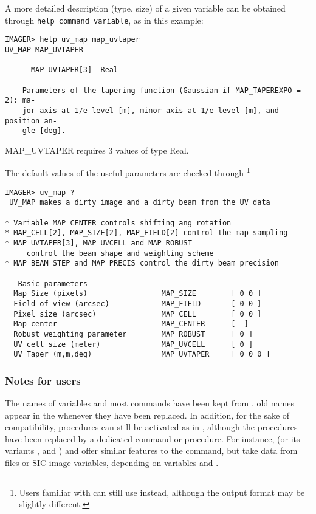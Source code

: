 A more detailed description (type, size) of a given variable can be obtained 
through \texttt{help command variable}, as in this example:
\begin{verbatim} 
IMAGER> help uv_map map_uvtaper
UV_MAP MAP_UVTAPER
 
      MAP_UVTAPER[3]  Real
 
    Parameters of the tapering function (Gaussian if MAP_TAPEREXPO = 2): ma-
    jor axis at 1/e level [m], minor axis at 1/e level [m], and position an-
    gle [deg].
\end{verbatim} 
MAP\_UVTAPER requires 3 values of type Real.
\vspace{0.5cm}

The default values of the useful parameters are checked through 
\footnote{Users familiar with \mapping{} can still use 
 instead, although the output format may be slightly 
different.}
\begin{verbatim} 
IMAGER> uv_map ?
 UV_MAP makes a dirty image and a dirty beam from the UV data
 
* Variable MAP_CENTER controls shifting ang rotation
* MAP_CELL[2], MAP_SIZE[2], MAP_FIELD[2] control the map sampling
* MAP_UVTAPER[3], MAP_UVCELL and MAP_ROBUST
     control the beam shape and weighting scheme
* MAP_BEAM_STEP and MAP_PRECIS control the dirty beam precision
 
-- Basic parameters 
  Map Size (pixels)                 MAP_SIZE        [ 0 0 ]
  Field of view (arcsec)            MAP_FIELD       [ 0 0 ]
  Pixel size (arcsec)               MAP_CELL        [ 0 0 ] 
  Map center                        MAP_CENTER      [  ]      
  Robust weighting parameter        MAP_ROBUST      [ 0 ]
  UV cell size (meter)              MAP_UVCELL      [ 0 ]   
  UV Taper (m,m,deg)                MAP_UVTAPER     [ 0 0 0 ] 
\end{verbatim} 

\subsubsection{Notes for \mapping{} users}

The names of variables and most commands have been kept from 
\mapping{}, old names appear in the  whenever they have been 
replaced. In addition, for the sake of compatibility, \sic{} procedures 
can still be activated as in \mapping{},  
although the  procedures have been replaced by a 
dedicated \imager{} command or procedure. For instance,   
(or its variants ,  and ) and 
 offer 
similar features to the  command, but take data from files or 
SIC image variables, depending on variables  and . 

